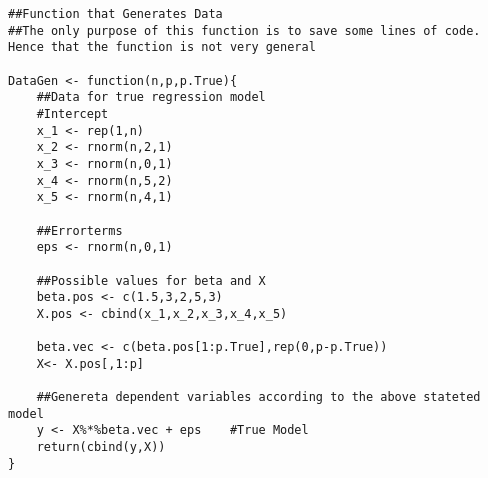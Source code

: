 \documentclass[Research_Module_ES.tex]{subfiles}
\begin{document}
\begin{lstlisting}[title={Data Generating Process}]
##Function that Generates Data
##The only purpose of this function is to save some lines of code. Hence that the function is not very general

DataGen <- function(n,p,p.True){
	##Data for true regression model
	#Intercept
	x_1 <- rep(1,n)         
	x_2 <- rnorm(n,2,1)
	x_3 <- rnorm(n,0,1)
	x_4 <- rnorm(n,5,2)
	x_5 <- rnorm(n,4,1)
	
	##Errorterms
	eps <- rnorm(n,0,1)     

	##Possible values for beta and X
	beta.pos <- c(1.5,3,2,5,3)
	X.pos <- cbind(x_1,x_2,x_3,x_4,x_5)

	beta.vec <- c(beta.pos[1:p.True],rep(0,p-p.True)) 
	X<- X.pos[,1:p]

	##Genereta dependent variables according to the above stateted model
	y <- X%*%beta.vec + eps    #True Model
	return(cbind(y,X))
}

\end{lstlisting}
\end{document}
